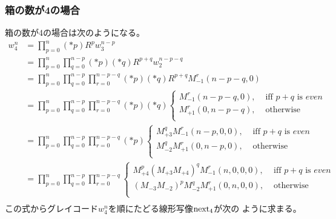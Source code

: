 \subsubsection{箱の数が4の場合}\label{s3:箱の数が4の場合} %
	箱の数が4の場合は次のようになる。
	\begin{equation*}\begin{split} %
		w_4^n &= \prod_{p=0}^n(*p)R^pw_3^{n-p} \\
		&= \prod_{p=0}^n\prod_{q=0}^{n-p}(*p)(*q)R^{p+q}w_2^{n-p-q} \\
		&= \prod_{p=0}^n\prod_{q=0}^{n-p}\prod_{r=0}^{n-p-q}(*p)(*q)R^{p+q}
			M_{-1}^r(n-p-q,0) \\
		&= \prod_{p=0}^n\prod_{q=0}^{n-p}\prod_{r=0}^{n-p-q}(*p)(*q)
		\begin{cases}
			M_{-1}^r(n-p-q,0), &\text{ iff }p+q\text{ is } even \\
			M_{+1}^r(0,n-p-q), &\text{ otherwise } \\
		\end{cases} \\
		&= \prod_{p=0}^n\prod_{q=0}^{n-p}\prod_{r=0}^{n-p-q}(*p) \begin{cases}
			M_{+3}^qM_{-1}^r(n-p,0,0), &\text{ iff }p+q\text{ is } even \\
			M_{-2}^qM_{+1}^r(0,n-p,0), &\text{ otherwise } \\
		\end{cases} \\
		&= \prod_{p=0}^n\prod_{q=0}^{n-p}\prod_{r=0}^{n-p-q} \begin{cases}
			M_{+4}^p(M_{+3}M_{+4})^qM_{-1}^r(n,0,0,0)
				, &\text{ iff }p+q\text{ is } even \\
			(M_{-3}M_{-2})^pM_{-2}^qM_{+1}^r(0,n,0,0), &\text{ otherwise } \\
		\end{cases} \\
	\end{split}\end{equation*} %
	この式からグレイコード$w_4^n$を順にたどる線形写像$\operatorname{next}_4$が次の
	ように求まる。

